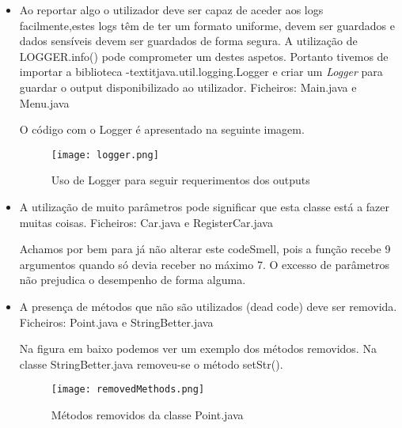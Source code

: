 \begin{itemize}
\item Ao reportar algo o utilizador deve ser capaz de aceder aos logs facilmente,estes logs têm de ter um formato uniforme, devem ser guardados e dados sensíveis devem ser guardados de forma segura. A utilização de LOGGER.info() pode comprometer um destes aspetos. Portanto tivemos de importar a biblioteca -textit{java.util.logging.Logger} e criar um \textit{Logger} para guardar o output disponibilizado ao utilizador.\newline
 Ficheiros: Main.java e  Menu.java\newline

\par O código com o Logger é apresentado na seguinte imagem.

 \begin{figure}[H]

  \centering

  \texttt{[image: logger.png]}

  \caption {Uso de Logger para seguir requerimentos dos outputs}

  \label {fig14}

\end{figure}
\end{itemize}

\begin{itemize}
\item A utilização de muito parâmetros pode significar que esta classe está a fazer muitas coisas. \newline
Ficheiros: Car.java e RegisterCar.java\newline


\par Achamos por bem para já não alterar este codeSmell, pois a função recebe 9 argumentos quando só devia receber no máximo 7. O excesso de parâmetros não prejudica o desempenho de forma alguma.

\end{itemize}

\begin{itemize}
\item A presença de métodos que não são utilizados (dead code) deve ser removida. \newline
Ficheiros: Point.java e StringBetter.java \newline

\par Na figura em baixo podemos ver um exemplo dos métodos removidos. Na classe StringBetter.java removeu-se o método setStr().
 \begin{figure}[H]

  \centering

  \texttt{[image: removedMethods.png]}

  \caption {Métodos removidos da classe Point.java}

  \label {fig15}

\end{figure}
\end{itemize}

